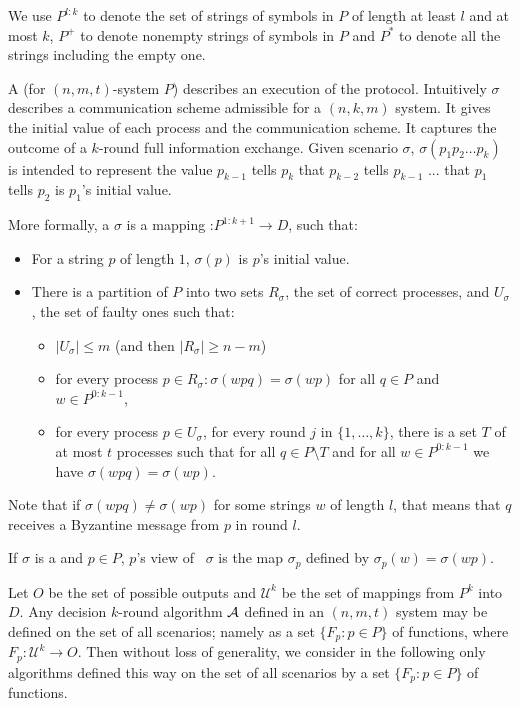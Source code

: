 {{We use $P^{l:k}$ to denote the set of strings of symbols in $P$ of length at least $l$ 
and at most $k$, $P^{+}$ to denote nonempty strings of symbols in $P$
and $P^{*}$ to denote all the strings including the empty one.

 A {} (for $(n,m,t)$-system $P$) describes an
 execution of the protocol. Intuitively  $\sigma$ describes a 
 communication scheme admissible for a $(n,k,m)$ system.
 It gives the initial value of each process and the communication scheme.
It captures the outcome of a $k$-round full information exchange.
Given scenario $\sigma$, 
$\sigma ( p_{1}
p_{2} \ldots p_{k} )$ is intended to represent the value $p_{k-1}$
tells $p_k$ that $p_{k-2}$ tells $p_{k-1}$ ... that $p_1$ tells $p_2$
is $p_1$'s initial value. 

 More formally,  a  {} $\sigma$
  is a mapping :$P^{1:k+1}
\rightarrow D$, such that:
\begin{itemize}
\item
For a string $p$ of length $1$, $\sigma(p)$ is $p$'s initial value. 
\item
There is a partition of $P$ into two sets $R_{\sigma} $, the set of
correct processes,  and $U_\sigma$, the set of faulty ones
such that:
\begin{itemize}
\item
$|U_\sigma| \leq m$ (and then $|R_\sigma|\geq n-m$)
\item
for every  process $p\in R_{\sigma} : \sigma(w p q) = \sigma(w p)$ for all
$q\in P$ and $w\in P^{0:k-1}$,  
\item
for every process $p\in U_\sigma$,  for every round $j$ in $\{1,\ldots
, k\}$,  there is a set $T$ of at most $t$ processes such that for
all $q\in P\setminus T$  and for all
$w\in P^{0:k-1}$ we have $\sigma(w p q) = \sigma(w p)$.
\end{itemize}
\end{itemize}
Note that if  $\sigma(wpq) \neq \sigma(wp)$ for some strings $w$ of
length $l$, that means that $q$  receives a Byzantine message from $p$
in round $l$.



If $\sigma$ is a
{} and $p \in P$, $p$'s view of \ $\sigma$ is
the map $\sigma_p$ defined by 
$\sigma_{p} ( w ) = \sigma ( w p )$. 


Let $O$ be the set of possible outputs and $\mathcal{U}^{k}$ be the
set of mappings from $P^{k}$ into $D$.
Any decision $k$-round algorithm $\cal A$ defined in an $(n,m,t)$ system
may be defined  on the set of all scenarios; namely as a set $\{ F_{p}
: p \in P \}$ of functions, 
where $F_{p} : \mathcal{U}^{k}  \rightarrow O$. 
Then without loss of generality, we consider in the following only algorithms
defined this way on the set of all scenarios by a set $\{ F_{p}
: p \in P \}$ of functions.

}}

